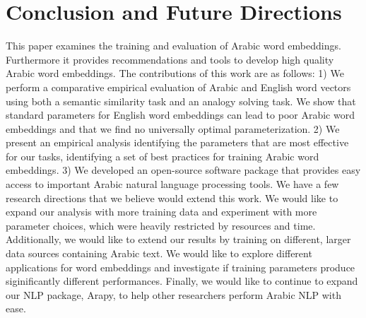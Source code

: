 \section{Conclusion and Future Directions}
\label{sec:conclusion}

This paper examines the training and evaluation of Arabic word embeddings. Furthermore it provides recommendations and tools to develop high quality Arabic word embeddings. The contributions of this work are as follows: 1) We perform a comparative empirical evaluation of Arabic and English word vectors using both a semantic similarity task and an analogy solving task. We show that standard parameters for English word embeddings can lead to poor Arabic word embeddings and that we find no universally optimal parameterization. 2) We present an empirical analysis identifying the parameters that are most effective for our tasks, identifying a set of best practices for training Arabic word embeddings. 3) We developed an open-source software package that provides easy access to important Arabic natural language processing tools. 
We have a few research directions that we believe would extend this work. We would like to expand our analysis with more training data and experiment with more parameter choices, which were heavily restricted by resources and time. Additionally, we would like to extend our results by training on different, larger data sources containing Arabic text. We would like to explore different applications for word embeddings and investigate if training parameters produce siginificantly different performances. Finally, we would like to continue to expand our NLP package, Arapy, to help other researchers perform Arabic NLP with ease.